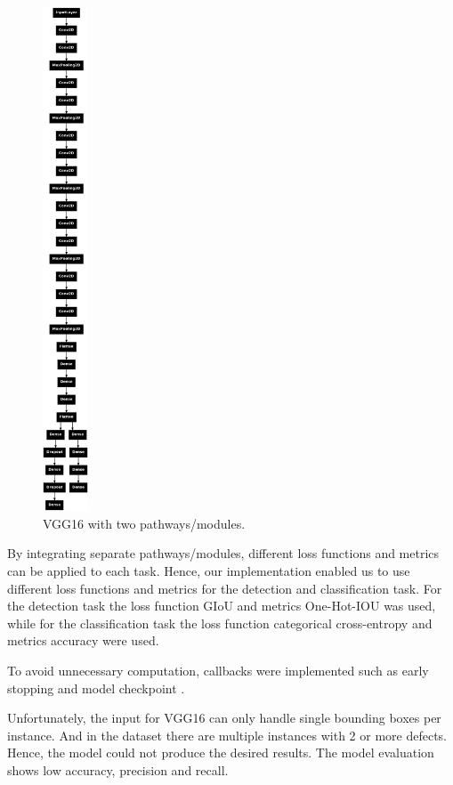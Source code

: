 \documentclass[12pt]{article}
\begin{document}
\begin{figure}[h]
    \centering
    \includegraphics[width=0.12\textwidth]{./graphics/3.png}
    \caption{VGG16 with two pathways/modules.}
    \label{fig:VGG16architecture}
\end{figure}

By integrating separate pathways/modules, different loss functions and metrics can be applied to each task. Hence, our implementation enabled us to use different loss functions and metrics for the detection and classification task. 
For the detection task the loss function GIoU and metrics One-Hot-IOU was used, while for the classification task the loss function categorical cross-entropy and metrics accuracy were used.

To avoid unnecessary computation, callbacks were implemented such as early stopping and model checkpoint \cite{TensorFlowAPI}. 

Unfortunately, the input for VGG16 can only handle single bounding boxes per instance. And in the dataset there are multiple instances with 2 or more defects. Hence, the model could not produce the desired results. The model evaluation shows low accuracy, precision and recall.   
\end{document}
